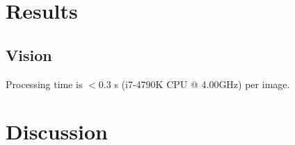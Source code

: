 \documentclass[10pt,twocolumn,letterpaper]{article}
\begin{document}
\section{Results}

\subsection{Vision}
Processing time is $< 0.3$ s (i7-4790K CPU @ 4.00GHz) per image.


\section{Discussion}

{\small


}
\end{document}
